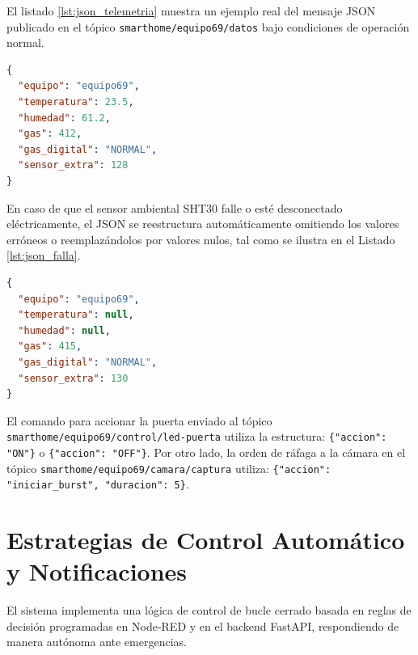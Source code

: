 \documentclass[12pt,letterpaper]{article}
\begin{document}
El listado \ref{lst:json_telemetria} muestra un ejemplo real del mensaje JSON publicado en el tópico \texttt{smarthome/equipo69/datos} bajo condiciones de operación normal.

\begin{lstlisting}[language=json, label=lst:json_telemetria, caption={Ejemplo de payload JSON publicado por el nodo de sensores.}]
{
  "equipo": "equipo69",
  "temperatura": 23.5,
  "humedad": 61.2,
  "gas": 412,
  "gas_digital": "NORMAL",
  "sensor_extra": 128
}
\end{lstlisting}

En caso de que el sensor ambiental SHT30 falle o esté desconectado eléctricamente, el JSON se reestructura automáticamente omitiendo los valores erróneos o reemplazándolos por valores nulos, tal como se ilustra en el Listado \ref{lst:json_falla}.

\begin{lstlisting}[language=json, label=lst:json_falla, caption={Ejemplo de payload JSON bajo falla del sensor SHT30.}]
{
  "equipo": "equipo69",
  "temperatura": null,
  "humedad": null,
  "gas": 415,
  "gas_digital": "NORMAL",
  "sensor_extra": 130
}
\end{lstlisting}

El comando para accionar la puerta enviado al tópico \texttt{smarthome/equipo69/control/led-puerta} utiliza la estructura: \texttt{\{"accion": "ON"\}} o \texttt{\{"accion": "OFF"\}}. Por otro lado, la orden de ráfaga a la cámara en el tópico \texttt{smarthome/equipo69/camara/captura} utiliza: \texttt{\{"accion": "iniciar\_burst", "duracion": 5\}}.

\newpage
\section{Estrategias de Control Automático y Notificaciones}
El sistema implementa una lógica de control de bucle cerrado basada en reglas de decisión programadas en Node-RED y en el backend FastAPI, respondiendo de manera autónoma ante emergencias.
\end{document}
